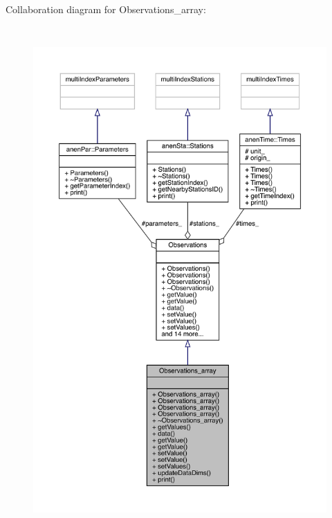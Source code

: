 Collaboration diagram for Observations\+\_\+array\+:
\nopagebreak
\begin{figure}[H]
\begin{center}
\leavevmode
\includegraphics[height=550pt]{class_observations__array__coll__graph}
\end{center}
\end{figure}
